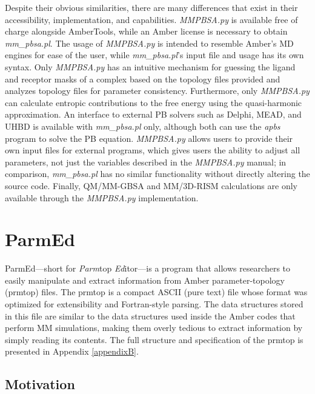 Despite their obvious similarities, there are many differences that exist in
their accessibility, implementation, and capabilities. \emph{MMPBSA.py} is
available free of charge alongside AmberTools, while an Amber license is
necessary to obtain \emph{mm\_pbsa.pl}. The usage of \emph{MMPBSA.py} is
intended to resemble Amber’s MD engines for ease of the user, while
\emph{mm\_pbsa.pl}’s input file and usage has its own syntax. Only
\emph{MMPBSA.py} has an intuitive mechanism for guessing the ligand and receptor
masks of a complex based on the topology files provided and analyzes topology
files for parameter consistency. Furthermore, only \emph{MMPBSA.py} can
calculate entropic contributions to the free energy using the quasi-harmonic
approximation. An interface to external PB solvers such as Delphi, MEAD, and
UHBD is available with \emph{mm\_pbsa.pl} only, although both can use the
\emph{apbs} program to solve the PB equation. \emph{MMPBSA.py} allows users to
provide their own input files for external programs, which gives users the
ability to adjust all parameters, not just the variables described in the
\emph{MMPBSA.py} manual; in comparison, \emph{mm\_pbsa.pl} has no similar
functionality without directly altering the source code. Finally, QM/MM-GBSA and
MM/3D-RISM calculations are only available through the \emph{MMPBSA.py}
implementation.

\section{ParmEd}

ParmEd---short for \emph{Parm}top \emph{Ed}itor---is a program that allows
researchers to easily manipulate and extract information from Amber
parameter-topology (prmtop) files. The prmtop is a compact ASCII (\ie pure text)
file whose format was optimized for extensibility and Fortran-style parsing. The
data structures stored in this file are similar to the data structures used
inside the Amber codes that perform MM simulations, making them overly tedious
to extract information by simply reading its contents. The full structure and
specification of the prmtop is presented in Appendix \ref{appendixB}.

\subsection{Motivation}

